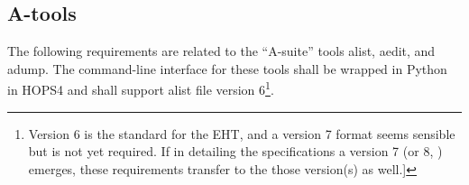 
\subsection{A-tools}
\label{sec:areq}

The following requirements are related to the ``A-suite'' tools \acs{alist}, \acs{aedit},
and \acs{adump}.  The command-line interface for these tools shall be wrapped
in Python in HOPS4 and shall support alist file version 6\footnote{Version 6 is the standard for the \ac{EHT}, and a version 7 format seems
sensible but is not yet required.  If in detailing the specifications
a version 7 (or 8, \etc) emerges, these requirements transfer
to the those version(s) as well.]}.




